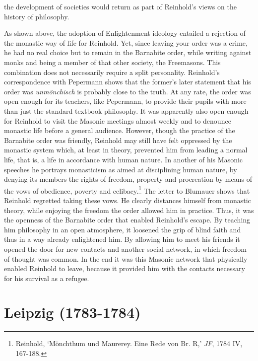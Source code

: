the development of societies would return as part of Reinhold's views on the history of philosophy. 

As shown above, the adoption of Enlightenment ideology entailed a rejection of the monastic way of life for Reinhold. Yet, since leaving your order was a crime, he had no real choice but to remain in the Barnabite order, while writing against monks and being a member of that other society, the Freemasons. This combination does not necessarily require a split personality. Reinhold's correspondence with Pepermann shows that the former's later statement that his order was \textit{unm\"{o}nchisch} is probably close to the truth. At any rate, the order was open enough for its teachers, like Pepermann, to provide their pupils with more than just the standard textbook philosophy. It was apparently also open enough for Reinhold to visit the Masonic meetings almost weekly and to denounce monastic life before a general audience. However, though the practice of the Barnabite order was friendly, Reinhold may still have felt oppressed by the monastic system which, at least in theory, prevented him from leading a normal life, that is, a life in accordance with human nature. In another of his Masonic speeches he portrays monasticism as aimed at disciplining human nature, by denying its members the rights of freedom, property and procreation by means of the vows of obedience, poverty and celibacy.\footnote{ Reinhold, `M\"{o}nchthum und Maurerey. Eine Rede von Br. R\textasteriskcentered \textasteriskcentered ,' \textit{JF}, 1784 IV, 167{-}188.} The letter to Blumauer shows that Reinhold regretted taking these vows. He clearly distances himself from monastic theory, while enjoying the freedom the order allowed him in practice. Thus, it was the openness of the Barnabite order that enabled Reinhold's escape. By teaching him philosophy in an open atmosphere, it loosened the grip of blind faith and thus in a way already enlightened him. By allowing him to meet his friends it opened the door for new contacts and another social network, in which freedom of thought was common. In the end it was this Masonic network that physically enabled Reinhold to leave, because it provided him with the contacts necessary for his survival as a refugee.


\section{Leipzig (1783{-}1784)}


